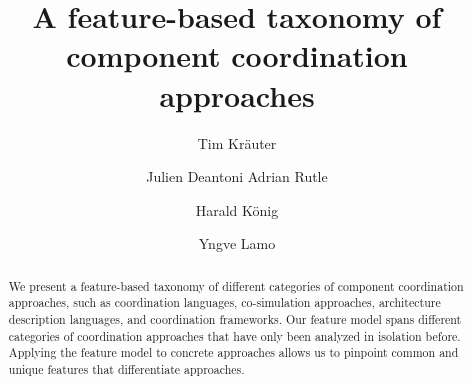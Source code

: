 \documentclass[runningheads]{llncs}
\begin{document}
\title{A feature-based taxonomy of component coordination approaches}

\author{Tim Kr\"{a}uter \and
Julien Deantoni
Adrian Rutle \and
Harald K\"{o}nig \and
Yngve Lamo}
%
%
\maketitle

\begin{abstract}
We present a feature-based taxonomy of different categories of component coordination approaches, such as coordination languages, co-simulation approaches, architecture description languages, and coordination frameworks.
Our feature model spans different categories of coordination approaches that have only been analyzed in isolation before.
Applying the feature model to concrete approaches allows us to pinpoint common and unique features that differentiate approaches.
\end{abstract}


\end{document}
